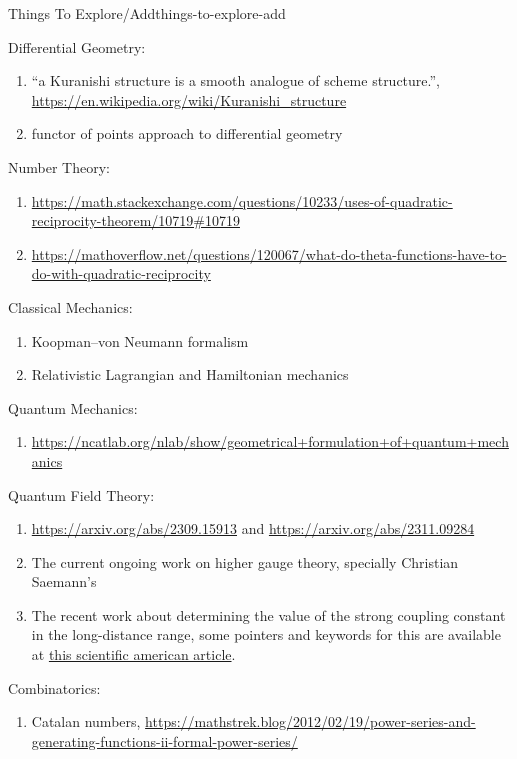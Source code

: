 \begin{remark}{Things To Explore/Add}{things-to-explore-add}
\begin{enumerate}
    \end{enumerate}
    Differential Geometry:
    \begin{enumerate}
        \item ``a Kuranishi structure is a smooth analogue of scheme structure.'', \url{https://en.wikipedia.org/wiki/Kuranishi_structure}
        \item functor of points approach to differential geometry
    \end{enumerate}
    Number Theory:
    \begin{enumerate}
        \item \url{https://math.stackexchange.com/questions/10233/uses-of-quadratic-reciprocity-theorem/10719#10719}
        \item \url{https://mathoverflow.net/questions/120067/what-do-theta-functions-have-to-do-with-quadratic-reciprocity}
    \end{enumerate}
    Classical Mechanics:
    \begin{enumerate}
        \item Koopman--von Neumann formalism
        \item Relativistic Lagrangian and Hamiltonian mechanics
    \end{enumerate}
    Quantum Mechanics:
    \begin{enumerate}
        \item \url{https://ncatlab.org/nlab/show/geometrical+formulation+of+quantum+mechanics}
    \end{enumerate}
    Quantum Field Theory:
    \begin{enumerate}
        \item \url{https://arxiv.org/abs/2309.15913} and \url{https://arxiv.org/abs/2311.09284}
        \item The current ongoing work on higher gauge theory, specially Christian Saemann's
        \item The recent work about determining the value of the strong coupling constant in the long-distance range, some pointers and keywords for this are available at \href{https://www.scientificamerican.com/article/physicists-finally-know-how-the-strong-force-gets-its-strength/}{this scientific american article}.
    \end{enumerate}
    Combinatorics:
    \begin{enumerate}
        \item Catalan numbers, \url{https://mathstrek.blog/2012/02/19/power-series-and-generating-functions-ii-formal-power-series/}

\end{enumerate}
\end{remark}
